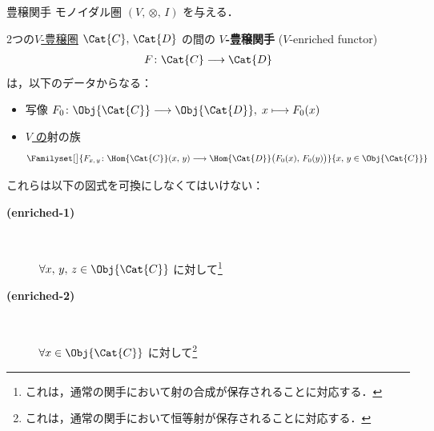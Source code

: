 \documentclass[TQFT_main]{subfiles}
\begin{document}
\begin{mydef}[label=redef:enriched-functor]{豊穣関手}
    モノイダル圏 $(V,\, \otimes,\, I)$ を与える．

    2つの\hyperref[redef:enriched]{$V$-豊穣圏} $\Cat{C},\, \Cat{D}$ の間の $V$\textbf{-豊穣関手} ($V$-enriched functor) 
    \begin{align}
        F \colon \Cat{C} \lto \Cat{D}
    \end{align}
    は，以下のデータからなる：
    \begin{itemize}
        \item 写像 $F_0\colon \Obj{\Cat{C}} \lto \Obj{\Cat{D}},\; x \lmto F_0(x)$
        \item \underline{$V$ の}射の族
        \begin{align}
            \Familyset[\big]{F_{x,\, y} \colon \Hom{\Cat{C}} (x,\, y) \lto \Hom{\Cat{D}} \bigl( F_0(x),\, F_0(y) \bigr) }{x,\, y \in \Obj{\Cat{C}}}
        \end{align}
    \end{itemize}
    これらは以下の図式を可換にしなくてはいけない：
    \begin{description}
        \item[\textbf{(enriched-1)}]　
        
        $\forall x,\, y,\, z \in \Obj{\Cat{C}}$ に対して\footnote{これは，通常の関手において射の合成が保存されることに対応する．}
        \begin{center}
        \end{center}
        \item[\textbf{(enriched-2)}]　
        
        $\forall x \in \Obj{\Cat{C}}$ に対して\footnote{これは，通常の関手において恒等射が保存されることに対応する．}
        \begin{center}
        \end{center}
        
    \end{description}
    
\end{mydef}
\end{document}
